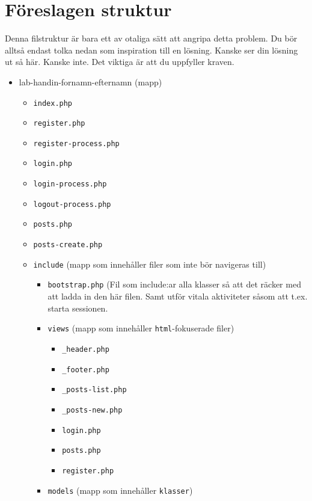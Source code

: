 \documentclass[12pt]{article}
\begin{document}
\pagebreak
\section{Föreslagen struktur}
Denna filstruktur är bara ett av otaliga sätt att angripa detta problem. Du bör alltså endast tolka nedan som inspiration till en lösning. Kanske ser din lösning ut så här. Kanske inte. Det viktiga är att du uppfyller kraven.

  \begin{itemize}
    \item lab-handin-fornamn-efternamn (mapp)
    \begin{itemize}
      \item \texttt{index.php}
      \item \texttt{register.php}
      \item \texttt{register-process.php}
      \item \texttt{login.php}
      \item \texttt{login-process.php}
      \item \texttt{logout-process.php}
      \item \texttt{posts.php}
      \item \texttt{posts-create.php}
      \item \texttt{include} (mapp som innehåller filer som inte bör navigeras till)
      \begin{itemize}
        \item \texttt{bootstrap.php} (Fil som include:ar alla klasser så att det räcker med att ladda in den här filen. Samt utför vitala aktiviteter såsom att t.ex. starta sessionen.
        \item \texttt{views} (mapp som innehåller \texttt{html}-fokuserade filer)
        \begin{itemize}
          \item \texttt{\_header.php}
          \item \texttt{\_footer.php}
          \item \texttt{\_posts-list.php}
          \item \texttt{\_posts-new.php}
          \item \texttt{login.php}
          \item \texttt{posts.php}
          \item \texttt{register.php}
        \end{itemize}
        \item \texttt{models} (mapp som innehåller \texttt{klasser})
        \begin{itemize}

\end{itemize}
\end{itemize}
\end{itemize}
\end{itemize}
\end{document}
